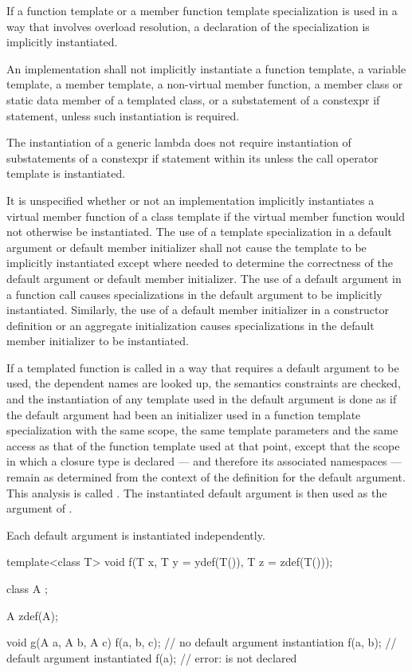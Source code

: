 \pnum
If a function template or a member function template specialization is used in
a way that involves overload resolution,
a declaration of the specialization is implicitly instantiated.

\pnum
An implementation shall not implicitly instantiate a function template,
a variable template,
a member template, a non-virtual member function, a member class or
static data member of a templated class, or a substatement of a constexpr if
statement, unless such instantiation is required.
\begin{note}
The instantiation of a generic lambda
does not require instantiation of
substatements of a constexpr if statement
within its 
unless the call operator template is instantiated.
\end{note}
It is unspecified whether or not an implementation implicitly instantiates a
virtual member function of a class template if the virtual member function would
not otherwise be instantiated.
The use of a template specialization in
a default argument or default member initializer
shall not cause the template to be implicitly instantiated except
where needed to determine
the correctness of the default argument or default member initializer.
The use of a default argument in a
function call causes specializations in the default argument to be implicitly
instantiated.
Similarly, the use of a default member initializer
in a constructor definition or an aggregate initialization
causes specializations in the default member initializer to be instantiated.

\pnum
If a templated function
is called in a way that requires a default argument to be used,
the dependent names are looked up, the semantics constraints are checked,
and the instantiation of any template used in the default argument
is done as if the default argument had been
an initializer used in a function template specialization with the same scope,
the same template parameters and the same access as that of the function template
used at that point, except that the scope in which a closure type is
declared --- and therefore its associated namespaces ---
remain as determined from the context of the definition for the default
argument.
This analysis is called
.
The instantiated default argument is then used as the argument of
.

\pnum
Each default argument is instantiated independently.
\begin{example}
\begin{codeblock}
template<class T> void f(T x, T y = ydef(T()), T z = zdef(T()));

class  A { };

A zdef(A);

void g(A a, A b, A c) {
  f(a, b, c);       // no default argument instantiation
  f(a, b);          // default argument  instantiated
  f(a);             // error:  is not declared
}
\end{codeblock}
\end{example}

